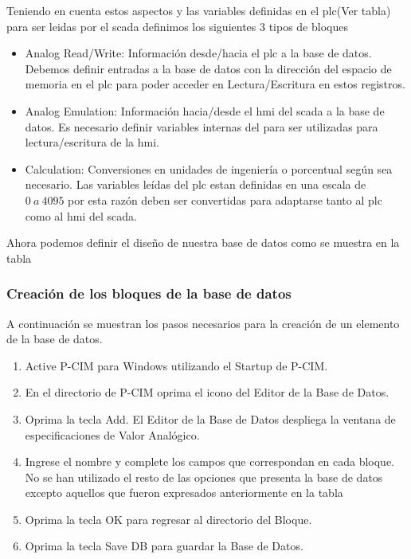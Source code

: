 Teniendo en cuenta estos aspectos y las variables definidas en el \gls{plc}(Ver tabla) 
para ser leidas por el \gls{scada} definimos los siguientes 3 tipos de bloques
\begin{itemize}
 \item Analog Read/Write: Información desde/hacia el \gls{plc} a la base de datos. Debemos definir entradas
 a la base de datos con la dirección del espacio de memoria en el \gls{plc} para poder acceder en Lectura/Escritura
 en estos registros.
 \item Analog Emulation: Información hacia/desde el \gls{hmi} del \gls{scada} a la base de datos. Es necesario 
 definir variables internas del  para ser utilizadas para lectura/escritura de la \gls{hmi}.
 \item Calculation:  Conversiones en unidades de ingeniería o porcentual según sea necesario. 
 Las variables leídas del \gls{plc} estan definidas en una escala de $0~a~4095$ por esta razón deben ser
 convertidas para adaptarse tanto al \gls{plc} como al \gls{hmi} del \gls{scada}.
\end{itemize}
Ahora podemos definir el diseño de nuestra base de datos como se muestra en la tabla

%


\subsubsection{Creación de los bloques de la base de datos}

A continuación se muestran los pasos necesarios para la creación de un elemento de la base de datos.
\begin{enumerate}
 \item Active P-CIM para Windows utilizando el Startup de P-CIM.
 \item En el directorio de P-CIM oprima el icono del Editor de la Base de Datos.
 \item Oprima la tecla Add. El Editor de la Base de Datos despliega la ventana de
  especificaciones de Valor Analógico.
 \item  Ingrese el nombre y complete los campos que correspondan en cada bloque. No se han utilizado
 el resto de las opciones que presenta la base de datos excepto aquellos que fueron expresados anteriormente 
 en la tabla 
 \item Oprima la tecla OK para regresar al directorio del Bloque.
 \item Oprima la tecla Save DB para guardar la Base de Datos.
\end{enumerate}

